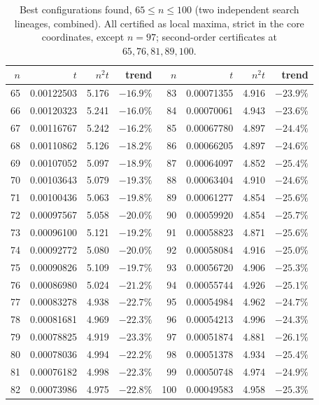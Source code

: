 \documentclass[11pt]{amsart}
\theoremstyle{definition}
\begin{document}
\begin{table}[htbp]
\centering\small
\caption{Best configurations found, $65 \le n \le 100$ (two independent search lineages, combined). All certified as local maxima, strict in the core coordinates, except $n = 97$; second-order certificates at $65, 76, 81, 89, 100$.}\label{tab:65-100}
\begin{tabular}{@{}rrrr@{\hspace{2.2em}}rrrr@{}}
\toprule
$n$ & $t$ & $n^2t$ & trend & $n$ & $t$ & $n^2t$ & trend \\
\midrule
65 & 0.00122503 & 5.176 & $-16.9\%$ & 83 & 0.00071355 & 4.916 & $-23.9\%$ \\
66 & 0.00120323 & 5.241 & $-16.0\%$ & 84 & 0.00070061 & 4.943 & $-23.6\%$ \\
67 & 0.00116767 & 5.242 & $-16.2\%$ & 85 & 0.00067780 & 4.897 & $-24.4\%$ \\
68 & 0.00110862 & 5.126 & $-18.2\%$ & 86 & 0.00066205 & 4.897 & $-24.6\%$ \\
69 & 0.00107052 & 5.097 & $-18.9\%$ & 87 & 0.00064097 & 4.852 & $-25.4\%$ \\
70 & 0.00103643 & 5.079 & $-19.3\%$ & 88 & 0.00063404 & 4.910 & $-24.6\%$ \\
71 & 0.00100436 & 5.063 & $-19.8\%$ & 89 & 0.00061277 & 4.854 & $-25.6\%$ \\
72 & 0.00097567 & 5.058 & $-20.0\%$ & 90 & 0.00059920 & 4.854 & $-25.7\%$ \\
73 & 0.00096100 & 5.121 & $-19.2\%$ & 91 & 0.00058823 & 4.871 & $-25.6\%$ \\
74 & 0.00092772 & 5.080 & $-20.0\%$ & 92 & 0.00058084 & 4.916 & $-25.0\%$ \\
75 & 0.00090826 & 5.109 & $-19.7\%$ & 93 & 0.00056720 & 4.906 & $-25.3\%$ \\
76 & 0.00086980 & 5.024 & $-21.2\%$ & 94 & 0.00055744 & 4.926 & $-25.1\%$ \\
77 & 0.00083278 & 4.938 & $-22.7\%$ & 95 & 0.00054984 & 4.962 & $-24.7\%$ \\
78 & 0.00081681 & 4.969 & $-22.3\%$ & 96 & 0.00054213 & 4.996 & $-24.3\%$ \\
79 & 0.00078825 & 4.919 & $-23.3\%$ & 97 & 0.00051874 & 4.881 & $-26.1\%$ \\
80 & 0.00078036 & 4.994 & $-22.2\%$ & 98 & 0.00051378 & 4.934 & $-25.4\%$ \\
81 & 0.00076182 & 4.998 & $-22.3\%$ & 99 & 0.00050748 & 4.974 & $-24.9\%$ \\
82 & 0.00073986 & 4.975 & $-22.8\%$ & 100 & 0.00049583 & 4.958 & $-25.3\%$ \\
\bottomrule
\end{tabular}
\end{table}
\end{document}
